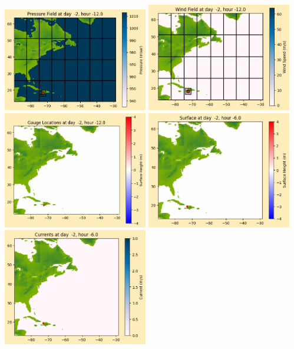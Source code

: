 \documentclass[11pt]{article}
\begin{document}
\includegraphics[width=0.475\textwidth]{frame0002fig1012.png}
\vskip 10pt 
\includegraphics[width=0.475\textwidth]{frame0002fig1013.png}
\includegraphics[width=0.475\textwidth]{frame0002fig1014.png}
\vskip 10pt 
\includegraphics[width=0.475\textwidth]{frame0003fig1001.png}
\includegraphics[width=0.475\textwidth]{frame0003fig1002.png}
\end{document}
